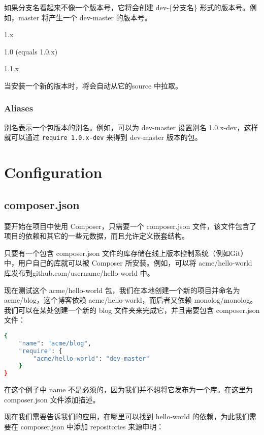 如果分支名看起来不像一个版本号，它将会创建 dev-\{分支名\} 形式的版本号。例如，master 将产生一个 dev-master 的版本号。

\begin{compactitem}
\item 1.x
\item 1.0 (equals 1.0.x)
\item 1.1.x
\end{compactitem}

当安装一个新的版本时，将会自动从它的source 中拉取。


\subsection{Aliases}



别名表示一个包版本的别名。例如，可以为 dev-master 设置别名 1.0.x-dev，这样就可以通过 \texttt{require 1.0.x-dev} 来得到 dev-master 版本的包。

\chapter{Configuration}

\section{composer.json}

要开始在项目中使用 Composer，只需要一个 composer.json 文件，该文件包含了项目的依赖和其它的一些元数据，而且允许定义嵌套结构。

只要有一个包含 composer.json 文件的库存储在线上版本控制系统（例如Git）中，用户自己的库就可以被 Composer 所安装。例如，可以将 acme/hello-world 库发布到github.com/username/hello-world 中。

现在测试这个 acme/hello-world 包，我们在本地创建一个新的项目并命名为 acme/blog，这个博客依赖 acme/hello-world，而后者又依赖 monolog/monolog。我们可以在某处创建一个新的 blog 文件夹来完成它，并且需要包含 composer.json 文件：

\begin{lstlisting}[language=bash]
{
    "name": "acme/blog",
    "require": {
        "acme/hello-world": "dev-master"
    }
}
\end{lstlisting}

在这个例子中 name 不是必须的，因为我们并不想将它发布为一个库。在这里为 composer.json 文件添加描述。

现在我们需要告诉我们的应用，在哪里可以找到 hello-world 的依赖，为此我们需要在 composer.json 中添加 repositories 来源申明：

